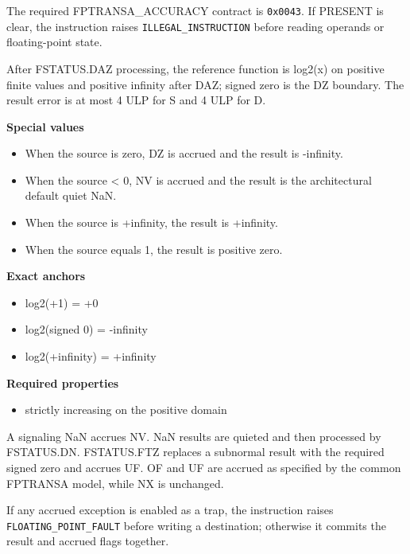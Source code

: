 The required FPTRANSA\_ACCURACY contract is \texttt{0x0043}. If PRESENT is clear, the instruction raises \texttt{ILLEGAL\_INSTRUCTION} before reading operands or floating-point state.

After FSTATUS.DAZ processing, the reference function is log2(x) on positive finite values and positive infinity after DAZ; signed zero is the DZ boundary. The result error is at most 4 ULP for S and 4 ULP for D.

\textbf{Special values}\par
\begin{itemize}
\item When the source is zero, DZ is accrued and the result is -infinity.
\item When the source \textless{} 0, NV is accrued and the result is the architectural default quiet NaN.
\item When the source is +infinity, the result is +infinity.
\item When the source equals 1, the result is positive zero.
\end{itemize}

\textbf{Exact anchors}\par
\begin{itemize}
\item log2(+1) = +0
\item log2(signed 0) = -infinity
\item log2(+infinity) = +infinity
\end{itemize}

\textbf{Required properties}\par
\begin{itemize}
\item strictly increasing on the positive domain
\end{itemize}

A signaling NaN accrues NV. NaN results are quieted and then processed by FSTATUS.DN. FSTATUS.FTZ replaces a subnormal result with the required signed zero and accrues UF. OF and UF are accrued as specified by the common FPTRANSA model, while NX is unchanged.

If any accrued exception is enabled as a trap, the instruction raises \texttt{FLOATING\_POINT\_FAULT} before writing a destination; otherwise it commits the result and accrued flags together.
